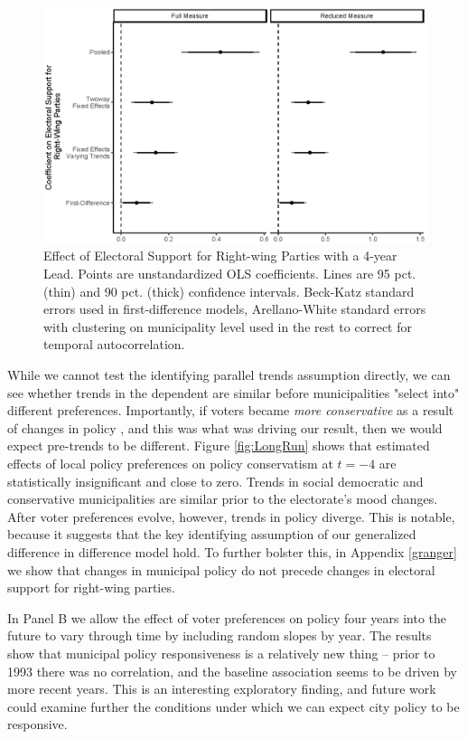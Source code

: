 \documentclass[a4paper,12pt]{article}
\begin{document}
\begin{figure}[h]
	\centering
	\includegraphics[scale = 0.8]{CoefPlot_18092018.eps}
	\caption{Effect of Electoral Support for Right-wing Parties with a 4-year Lead. Points are unstandardized OLS coefficients. Lines are 95 pct. (thin) and 90 pct. (thick) confidence intervals. Beck-Katz standard errors used in first-difference models, Arellano-White standard errors with clustering on municipality level used in the rest to correct for temporal autocorrelation.}
	\label{fig:FourYearLead}
\end{figure}


While we cannot test the identifying parallel trends assumption directly, we can see whether trends in the dependent are similar before municipalities "select into" different preferences. Importantly, if voters became \emph{more conservative} as a result of changes in policy \cite[cf.][]{lenz2013follow,slothuus2010can}, and this was what was driving our result, then we would expect pre-trends to be different. Figure \ref{fig:LongRun} shows that estimated effects of local policy preferences on policy conservatism at $t=-4$ are statistically insignificant and close to zero. Trends in social democratic and conservative municipalities are similar prior to the electorate's mood changes. After voter preferences evolve, however, trends in policy diverge.  This is notable, because it suggests that the key identifying assumption of our generalized difference in difference model hold. To further bolster this, in Appendix \ref{granger} we show that changes in municipal policy do not precede changes in electoral support for right-wing parties.

In Panel B we allow the effect of voter preferences on policy four years into the future to vary through time by including random slopes by year. The results show that municipal policy responsiveness is a relatively new thing -- prior to 1993 there was no correlation, and the baseline association seems to be driven by more recent years. This is an interesting exploratory finding, and future work could examine further the conditions under which we can expect city policy to be responsive.
 
\end{document}
